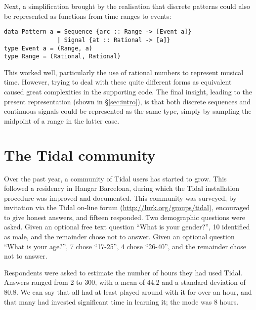 \documentclass[authoryear,preprint]{sigplanconf}
\begin{document}
Next, a simplification brought by the realisation that discrete
patterns could also be represented as functions from time ranges to
events:

\begin{lstlisting}
data Pattern a = Sequence {arc :: Range -> [Event a]}
               | Signal {at :: Rational -> [a]}
type Event a = (Range, a)
type Range = (Rational, Rational)
\end{lstlisting}

This worked well, particularly the use of rational numbers to
represent musical time. However, trying to deal with these quite
different forms as equivalent caused great complexities in the
supporting code. The final insight, leading to the present
representation (shown in \S \ref{sec:intro}), is that both discrete
sequences and continuous signals could be represented as the same
type, simply by sampling the midpoint of a range in the latter case.

\section{The Tidal community}
\label{sec:community}

Over the past year, a community of Tidal users has started to
grow. This followed a residency in Hangar Barcelona, during which the
Tidal installation procedure was improved and documented. This
community was surveyed, by invitation via the Tidal on-line forum
(\url{http://lurk.org/groups/tidal}), encouraged to give honest
answers, and fifteen responded. Two demographic questions were
asked. Given an optional free text question ``What is your gender?'',
10 identified as male, and the remainder chose not to answer. Given an
optional question ``What is your age?'', 7 chose ``17-25'', 4 chose
``26-40'', and the remainder chose not to answer.

Respondents were asked to estimate the number of hours they had used
Tidal. Answers ranged from 2 to 300, with a mean of 44.2 and a
standard deviation of 80.8. We can say that all had at least played
around with it for over an hour, and that many had invested
significant time in learning it; the mode was 8 hours.
\end{document}
